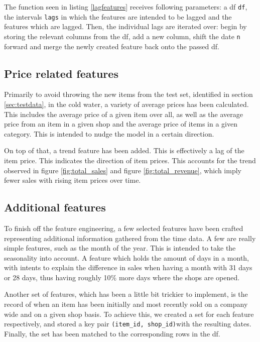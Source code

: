 

The function seen in listing \ref{lagfeatures} receives following parameters: a \gls{df} \texttt{df}, the intervals \texttt{lags} in which the features are intended to be lagged and the features which are lagged. Then, the individual lags are iterated over: begin by storing the relevant columns from the \gls{df}, add a new column, shift the date \texttt{n} forward and merge the newly created feature back onto the passed \gls{df}.


\subsection{Price related features}

Primarily to avoid throwing the new items from the test set, identified in section \ref{sec:testdata}, in the cold water, a variety of average prices has been calculated. This includes the average price of a given item over all, as well as the average price from an item in a given shop and the average price of items in a given category.
This is intended to nudge the model in a certain direction.

On top of that, a trend feature has been added. This is effectively a lag of the item price. 
This indicates the direction of item prices. This accounts for the trend observed in figure \ref{fig:total_sales} and figure \ref{fig:total_revenue}, which imply fewer sales with rising item prices over time.

\subsection{Additional features}

To finish off the feature engineering, a few selected features have been crafted representing additional information gathered from the time data. A few are really simple features, such as the month of the year. This is intended to take the seasonality into account. A feature which holds the amount of days in a month, with intents to explain the difference in sales when having a month with 31 days or 28 days, thus having roughly 10\% more days where the shops are opened.

Another set of features, which has been a little bit trickier to implement, is the record of when an item has been initially and most recently sold on a company wide and on a given shop basis.
To achieve this, we created a set for each feature respectively, and stored a key pair \texttt{(item\_id, shop\_id)}with the resulting dates. Finally, the set has been matched to the corresponding rows in the \gls{df}.

